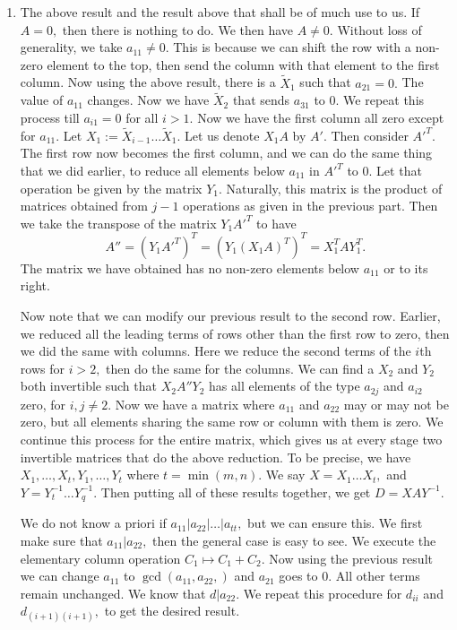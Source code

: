 \documentclass{article}
\begin{document}
\begin{enumerate}
	\item The above result and the result above that shall be of much use to us. If $A=0,$ then there is nothing to do. We then have $A\neq 0.$ Without loss 
	of generality, we take $a_{11}\neq 0.$ This is because we can shift the row with a non-zero element to the top, then send the column with that element 
	to the first column. Now using the above result, there is a $\tilde{X}_1$ such that $a_{21}=0.$ The value of $a_{11}$ changes. Now we have $\tilde{X}_2$ 
	that sends $a_{31}$ to $0.$ We repeat this process till $a_{i1}=0$ for all $i >1.$ Now we have the first column all zero except for $a_{11}.$ Let  
	$X_1:= \tilde{X}_{i-1}\dots \tilde{X}_1.$ Let us denote $X_1A$ by $A'.$ Then consider $A'^T.$ The first row now becomes the first column, and we can do 
	the same thing that we did earlier, to reduce all elements below $a_{11}$ in $A'^T$ to $0.$ Let that operation be given by the matrix $Y_1.$ Naturally, 
	this matrix is the product of matrices obtained from $j-1$ operations as given in the previous part. Then we take the transpose of the matrix $Y_1 A'^T$ 
	to have $$A''=(Y_1A'^T)^T=(Y_1(X_1A)^T)^T=X_1^TAY_1^T.$$ The matrix we have obtained has no non-zero elements below $a_{11}$ or to its right. 
	
	Now note that we can modify our previous result to the second row. Earlier, we reduced all the leading terms of rows other than the first row to zero, 
	then we did the same with columns. Here we reduce the second terms of the $i$th rows for $i >2,$ then do the same for the columns. We can find a $X_2$ 
	and $Y_2$ both invertible such that $X_2A''Y_2$ has all elements of the type $a_{2j}$ and $a_{i2}$ zero, for $i,j \neq 2.$ Now we have a matrix where 
	$a_{11}$ and $a_{22}$ may or may not be zero, but all elements sharing the same row or column with them is zero. We continue this process for the entire 
	matrix, which gives us at every stage two invertible matrices that do the above reduction. To be precise, we have $X_1,\dots,X_t, Y_1,\dots,Y_t$ where 
	$t=\min(m,n).$ We say $X=X_1\dots X_t,$ and $Y=Y_t^{-1}\dots Y_q^{-1}.$ Then putting all of these results together, we get $ D=XAY^{-1}.$ 
	
	We do not know a priori if $a_{11}|a_{22}|\dots |a_{tt},$ but we can ensure this. We first make sure that $a_{11}|a_{22},$ then the general case is easy 
	to see. We execute the elementary column operation $C_1 \mapsto C_1+C_2.$ Now using the previous result we can change $a_{11}$ to $\gcd(a_{11},a_{22},)$ 
	and $a_{21}$ goes to $0.$ All other terms remain unchanged. We know that $d | a_{22}.$ We repeat this procedure for $d_{ii}$ and $d_{(i+1)(i+1)},$ to 
	get the desired result.
\end{enumerate}
 
\end{document}
